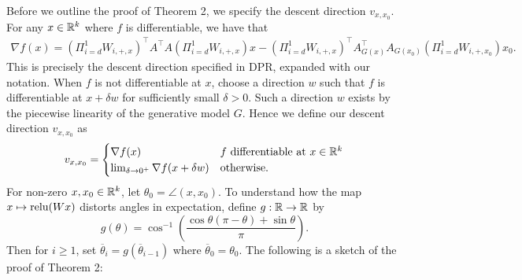 \documentclass{article}
\begin{document}
Before we outline the proof of Theorem 2, we specify the descent direction $v_{x,x_0}$. For any $x \in \mathbb{R}^k$ where $f$ is differentiable, we have that \begin{align*}
\nabla f(x) = (\Pi_{i=d}^1 W_{i,+,x})^\top A^\top A (\Pi_{i=d}^1 W_{i,+,x})x - (\Pi_{i=d}^1 W_{i,+,x})^\top A_{G(x)}^\top A_{G(x_0)}(\Pi_{i=d}^1 W_{i,+,x_0})x_0.
\end{align*} This is precisely the descent direction specified in DPR, expanded with our notation. When $f$ is not differentiable at $x$, choose a direction $w$ such that $f$ is differentiable at $x + \delta w$ for sufficiently small $\delta > 0$. Such a direction $w$ exists by the piecewise linearity of the generative model $G$. Hence we define our descent direction $v_{x,x_0}$ as \begin{align*}
v_{x,x_0} = \begin{cases}
\nabla f(x) & f\ \text{differentiable at } x\in \mathbb{R}^k \\
\lim_{\delta \rightarrow 0^+} \nabla f(x + \delta w) & \text{otherwise.}
\end{cases}
\end{align*} For non-zero $x,x_0 
\in \mathbb{R}^k$, let $\theta_0 = \angle (x,x_0)$. To understand how the map $x \mapsto \text{relu}(Wx)$ distorts angles in expectation, define $g : \mathbb{R} \rightarrow \mathbb{R}$ by $$g(\theta) = \cos^{-1}\left(\frac{\cos\theta(\pi - \theta)+\sin\theta}{\pi}
\right).$$ Then for $i \geq 1$, set $\overline{\theta}_i = g(\overline{\theta}_{i-1})$ where $\overline{\theta}_0 = \theta_0$. The following is a sketch of the proof of Theorem 2:
\end{document}
